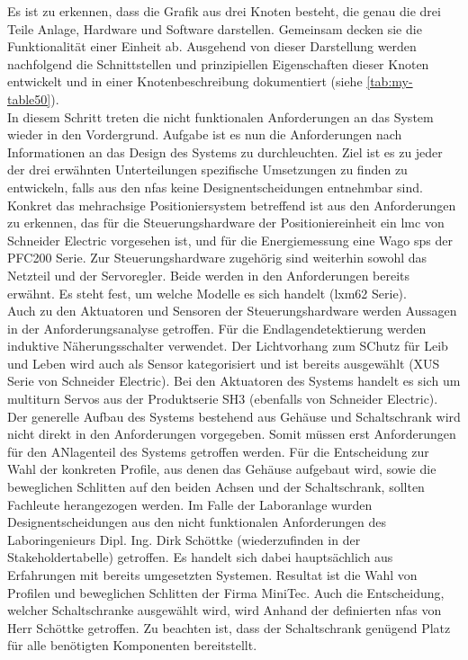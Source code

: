 \documentclass[../../../Bachelorarbeit.tex]{subfiles}
\begin{document}
Es ist zu erkennen, dass die Grafik aus drei Knoten besteht, die genau die drei Teile Anlage, Hardware und Software darstellen. Gemeinsam decken sie die Funktionalität einer Einheit ab. Ausgehend von dieser Darstellung werden nachfolgend die Schnittstellen und prinzipiellen Eigenschaften dieser Knoten entwickelt und in einer Knotenbeschreibung dokumentiert (siehe \autoref{tab:my-table50}). \\
In diesem Schritt treten die nicht funktionalen Anforderungen an das System wieder in den Vordergrund. Aufgabe ist es nun die Anforderungen nach Informationen an das Design des Systems zu durchleuchten. Ziel ist es zu jeder der drei erwähnten Unterteilungen spezifische Umsetzungen zu finden \bzw zu entwickeln, falls aus den \acp{nfa} keine Designentscheidungen entnehmbar sind. \\
Konkret das mehrachsige Positioniersystem betreffend ist aus den Anforderungen zu erkennen, das für die Steuerungshardware der Positioniereinheit ein \ac{lmc} von Schneider Electric vorgesehen ist, und für die Energiemessung eine Wago \ac{sps} der PFC200 Serie. Zur Steuerungshardware zugehörig sind weiterhin sowohl das Netzteil und der Servoregler. Beide werden in den Anforderungen bereits erwähnt. Es steht fest, um welche Modelle es sich handelt (\acs{lxm}62 Serie).\\ 
Auch zu den Aktuatoren und Sensoren der Steuerungshardware werden Aussagen in der Anforderungsanalyse getroffen. Für die Endlagendetektierung werden induktive Näherungsschalter verwendet. Der Lichtvorhang zum SChutz für Leib und Leben wird auch als Sensor kategorisiert und ist bereits ausgewählt (XUS Serie von Schneider Electric). Bei den Aktuatoren des Systems handelt es sich um multiturn Servos aus der Produktserie SH3 (ebenfalls von Schneider Electric). \\
Der generelle Aufbau des Systems bestehend aus Gehäuse und Schaltschrank wird nicht direkt in den Anforderungen vorgegeben. Somit müssen erst Anforderungen für den ANlagenteil des Systems getroffen werden. Für die Entscheidung zur Wahl der konkreten Profile, aus denen das Gehäuse aufgebaut wird, sowie die beweglichen Schlitten auf den beiden Achsen und der Schaltschrank, sollten Fachleute herangezogen werden. Im Falle der Laboranlage wurden Designentscheidungen aus den nicht funktionalen Anforderungen des Laboringenieurs Dipl. Ing. Dirk Schöttke (wiederzufinden in der Stakeholdertabelle) getroffen. Es handelt sich dabei hauptsächlich aus Erfahrungen mit bereits umgesetzten Systemen. Resultat ist die Wahl von Profilen und beweglichen Schlitten der Firma MiniTec. Auch die Entscheidung, welcher Schaltschranke ausgewählt wird, wird Anhand der definierten \acp{nfa} von Herr Schöttke getroffen. Zu beachten ist, dass der Schaltschrank genügend Platz für alle benötigten Komponenten bereitstellt.\\
\end{document}
